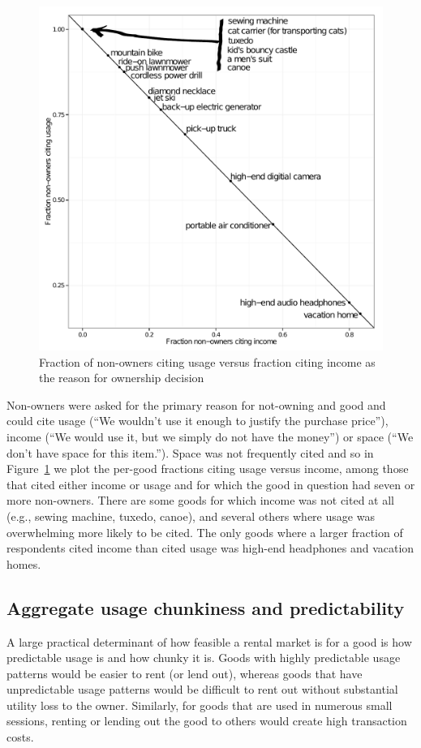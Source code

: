 \documentclass[11pt]{article}
\begin{document}
\begin{figure}
\centering 
\caption{Fraction of non-owners citing usage versus fraction citing income as the reason for ownership decision} 
\label{fig:reasons}
\begin{minipage}{0.60 \linewidth}
\includegraphics[width = \linewidth]{./plots/reasons_for_nonownership.pdf} 
\end{minipage} 
\end{figure} 

Non-owners were asked for the primary reason for not-owning and good and could cite usage (``We wouldn't use it enough to justify the purchase price''), income  (``We would use it, but we simply do not have the money'') or space (``We don't have space for this item.'').
Space was not frequently cited and so in Figure~\ref{fig:reasons} we plot the per-good fractions citing usage versus income, among those that cited either income or usage and for which the good in question had seven or more non-owners. 
There are some goods for which income was not cited at all (e.g., sewing machine, tuxedo, canoe), and several others where usage was overwhelming more likely to be cited.
The only goods where a larger fraction of respondents cited income than cited usage was high-end headphones and vacation homes. 

\subsection{Aggregate usage chunkiness and predictability} 
A large practical determinant of how feasible a rental market is for a good is how predictable usage is and how chunky it is. 
Goods with highly predictable usage patterns would be easier to rent (or lend out), whereas goods that have unpredictable usage patterns would be difficult to rent out without substantial utility loss to the owner.
Similarly, for goods that are used in numerous small sessions, renting or lending out the good to others would create high transaction costs.
\end{document}
